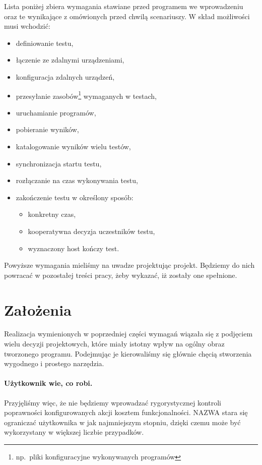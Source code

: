\documentclass[00-praca-magisterska.tex]{subfiles}
\begin{document}
Lista poniżej zbiera wymagania stawiane przed programem we wprowadzeniu oraz te
wynikające z omówionych przed chwilą scenariuszy. W skład możliwości musi wchodzić:
\begin{itemize}
\item definiowanie testu,
\item łączenie ze zdalnymi urządzeniami,
\item konfiguracja zdalnych urządzeń,
\item przesyłanie zasobów\footnote{np.~pliki konfiguracyjne wykonywanych programów}  wymaganych w testach,
\item uruchamianie programów,
\item pobieranie wyników,
\item katalogowanie wyników wielu testów,
\item synchronizacja startu testu,
\item rozłączanie na czas wykonywania testu,
\item zakończenie testu w określony sposób:
  \begin{itemize}
  \item konkretny czas,
  \item kooperatywna decyzja uczestników testu,
  \item wyznaczony host kończy test.
  \end{itemize}
\end{itemize}

Powyższe wymagania mieliśmy na uwadze projektując projekt. Będziemy do nich
powracać w pozostałej treści pracy, żeby wykazać, iż zostały one spełnione.

\section{Założenia}

Realizacja wymienionych w poprzedniej części wymagań wiązała się z podjęciem
wielu decyzji projektowych, które miały istotny wpływ na ogólny obraz tworzonego
programu.  Podejmując je kierowaliśmy się głównie chęcią stworzenia wygodnego i
prostego narzędzia.

\paragraph{Użytkownik wie, co robi.} Przyjęliśmy więc, że nie będziemy
wprowadzać rygorystycznej kontroli poprawności konfigurowanych akcji kosztem
funkcjonalności. NAZWA stara się ograniczać użytkownika w jak najmniejszym stopniu,
dzięki czemu może być wykorzystany w większej liczbie przypadków.
\end{document}
